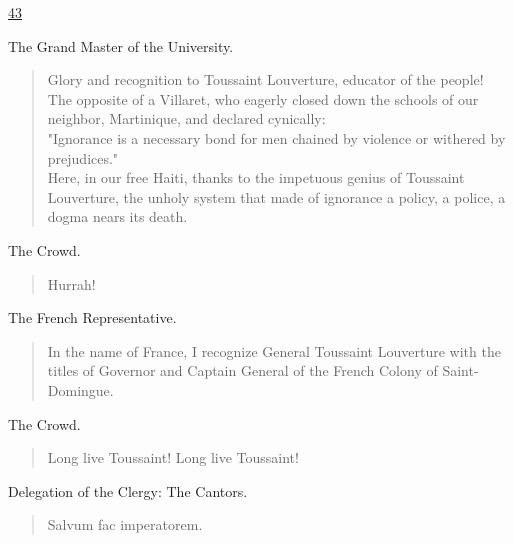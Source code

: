 \documentclass[letterpaper,article,12pt,oneside,notitlepage]{memoir}
\begin{document}
\clearpage

\href{http://cesaire.elotroalex.com/chiens/chiens/p043.html}{43}

\begin{center}The Grand Master of the University.\end{center}

\begin{verse}
Glory and recognition to Toussaint Louverture, educator of the people! The opposite of a Villaret, who eagerly closed down the schools of our neighbor, Martinique, and declared cynically: \\
\indent "Ignorance is a necessary bond for men chained by violence or withered by prejudices."   \\
Here, in our free Haiti, thanks to the impetuous genius of Toussaint Louverture, the unholy system that made of ignorance a policy, a police, a dogma nears its death. \\
\end{verse}

\begin{center}The Crowd.\end{center}

\begin{verse}
Hurrah! \\
\end{verse}

\begin{center}The French Representative.\end{center}

\begin{verse}
\indent In the name of France, I recognize General Toussaint Louverture with the titles of Governor and Captain General of the French Colony of Saint-Domingue. \\
\end{verse}

\begin{center}The Crowd.\end{center}

\begin{verse}
Long live Toussaint! Long live Toussaint! \\
\end{verse}

\begin{center}Delegation of the Clergy: The Cantors.\end{center}

\begin{verse}
Salvum fac imperatorem. \\
\end{verse}
\end{document}
